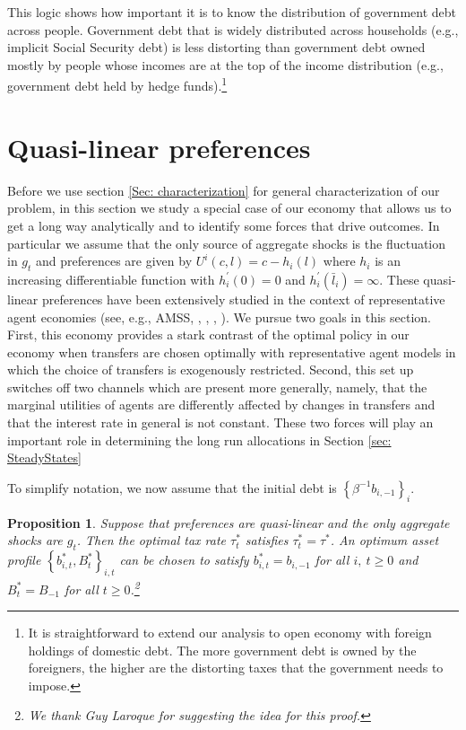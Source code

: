 \documentclass[thmsb,11pt]{article}
\newtheorem{proposition}{Proposition}
\begin{document}
This logic shows how important it is to know the distribution of government debt across people. Government debt that is widely distributed across households
(e.g., implicit Social Security debt) is less distorting than
 government debt owned mostly by people whose incomes are at the top of the income
distribution (e.g., government debt held by hedge funds).\footnote{%
It is straightforward to extend our analysis to open economy with foreign
holdings of domestic debt. The more government debt is owned by the
foreigners, the higher are the distorting taxes that  the government  needs to
impose.}

\section{Quasi-linear preferences}\label{Sec: quasilinear}
Before we use section \ref{Sec: characterization}  for general characterization of our problem, in this section we study a special case of our economy that allows us to get a long way analytically and to identify some forces that drive outcomes. In particular we assume that the only source of aggregate shocks is the fluctuation in $g_t$ and preferences are given by $U^{i}\left( c,l\right) =c-h_{i}(l)$ where $h_{i}$ is an increasing differentiable function with $h_{i}^{\prime
}\left( 0\right) =0$ and $h_{i}^{\prime }\left( \bar{l}_{i}\right) =\infty $. These quasi-linear preferences have been extensively studied in the context of representative agent economies (see, e.g.,  AMSS, \cite{Farhi2010}, \cite{Battaglini2007,Battaglini2008}, \cite{Yared2012}, \cite{Faraglia2011}). We pursue two goals in this section. First, this economy provides a stark contrast of the optimal policy in our economy when transfers are chosen optimally with representative agent models in which the choice of transfers is exogenously restricted. Second, this set up switches off two channels which are present more generally, namely, that the marginal utilities of agents are differently affected by changes in transfers and that the interest rate in general is not constant. These two forces will play an important role in determining the long run allocations in Section \ref{sec: SteadyStates}

To simplify notation, we now assume that the initial debt is $%
\left\{ \beta ^{-1}b_{i,-1}\right\} _{i}.$

\begin{proposition}
\label{Prop: quasilinear} Suppose that preferences are quasi-linear and the only aggregate shocks are $g_t$. Then the optimal tax rate $\tau
_{t}^{\ast }$ satisfies $\tau _{t}^{\ast }=\tau ^{\ast }$. An optimum asset
profile $\left \{ b_{i,t}^{\ast },B_{t}^{\ast }\right \} _{i,t}$ can be
chosen to satisfy $b_{i,t}^{\ast }=b_{i,-1}$ for all $i,\ t\geq 0$ and $%
B_{t}^{\ast }=B_{-1}$ for all $t\geq 0$.\footnote{%
We thank Guy Laroque for suggesting the idea for this proof.}
\end{proposition}
\end{document}
